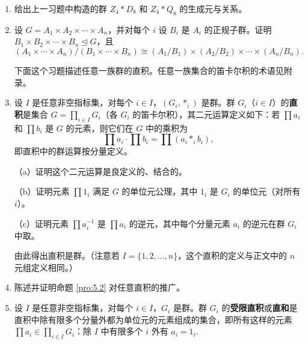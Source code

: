 \begin{enumerate}
（a）证明 \(A\) 和 \(B\) 在商群 \(A * B\) 中的像分别同构于 \(A\) 和 \(B\)，且这些像交为一个同构于 \(Z_1\) 的中心子群。求 \(|A * B|\).

（b）设 \(Z_4 = \langle x \rangle\). 设 \(D_8 = \langle r, s \rangle\)、\(Q_8 = \langle i, j \rangle\) 由通常的生成元与关系给出。设 \(Z_4 * D_8\) 是把 \(x^2\) 与 \(r^2\) 等同的 \(Z_4\) 与 \(D_8\) 的中心积（即 \(Z_1 = \langle x^2 \rangle\)、\(Z_2 = \langle r^2 \rangle\)，同构是 \(x^2 \mapsto r^2\)），设 \(Z_4 * Q_8\) 是把 \(x^2\) 与 \(-1\) 等同的 \(Z_4\) 与 \(Q_8\) 的中心积。证明 \(Z_4 * D_8 \cong Z_4 * Q_8\).

\item 给出上一习题中构造的群 \(Z_4 * D_8\) 和 \(Z_4 * Q_8\) 的生成元与关系。

\item 设 \(G = A_1 \times A_2 \times \cdots \times A_n\)，并对每个 \(i\) 设 \(B_i\) 是 \(A_i\) 的正规子群。证明 \(B_1 \times B_2 \times \cdots \times B_n \trianglelefteq G\)，且
\[
(A_1 \times \cdots \times A_n)/(B_1 \times \cdots \times B_n) \cong (A_1/B_1) \times (A_2/B_2) \times \cdots \times (A_n/B_n).
\]

\noindent 下面这个习题描述任意一族群的直积。任意一族集合的笛卡尔积的术语见附录。

\item 设 \(I\) 是任意非空指标集，对每个 \(i \in I\)，\((G_i, *_i)\) 是群。群 \(G_i\)（\(i \in I\)）的\textbf{直积}是集合 \(G = \prod_{i \in I} G_i\)（各 \(G_i\) 的笛卡尔积），其二元运算定义如下：若 \(\prod a_i\) 和 \(\prod b_i\) 是 \(G\) 的元素，则它们在 \(G\) 中的乘积为
\[
\prod a_i \cdot \prod b_i = \prod (a_i *_i b_i),
\]
即直积中的群运算按分量定义。

（a）证明这个二元运算是良定义的、结合的。

（b）证明元素 \(\prod 1_i\) 满足 \(G\) 的单位元公理，其中 \(1_i\) 是 \(G_i\) 的单位元（对所有 \(i\)）。

（c）证明元素 \(\prod a_i^{-1}\) 是 \(\prod a_i\) 的逆元，其中每个分量元素 \(a_i\) 的逆元在群 \(G_i\) 中取。

由此得出直积是群。（注意若 \(I = \{1, 2, \ldots, n\}\)，这个直积的定义与正文中的 \(n\) 元组定义相同。）

\item 陈述并证明命题 \ref{pro:5.2} 对任意直积的推广。

\item 设 \(I\) 是任意非空指标集，对每个 \(i \in I\)，\(G_i\) 是群。群 \(G_i\) 的\textbf{受限直积}或\textbf{直和}是直积中除有限多个分量外都为单位元的元素组成的集合，即所有这样的元素 \(\prod a_i \in \prod_{i \in I} G_i\)：除 \(I\) 中有限多个 \(i\) 外有 \(a_i = 1_i\).


\end{enumerate}
